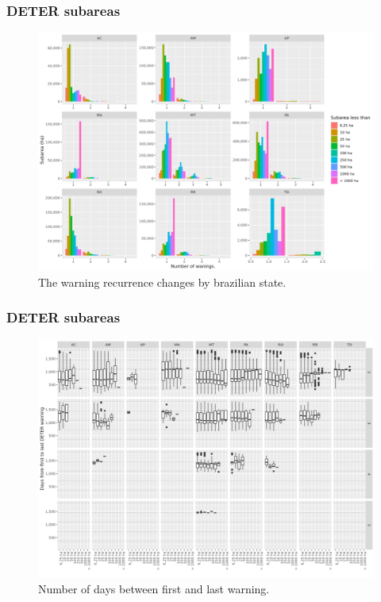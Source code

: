 \documentclass[aspectratio=169]{beamer}
\begin{document}
\begin{frame}
    \frametitle{DETER subareas}
    \begin{figure}[h] 
        \includegraphics[width=0.65\linewidth]
        {./figures/plot_deter_subarea_by_warnings_state.png}
        \caption{The warning recurrence changes by brazilian state.}
        \label{fig:deter_subarea_warnings_state}
    \end{figure}
\end{frame}

\begin{frame}
    \frametitle{DETER subareas}
    \begin{figure}[h] 
        \includegraphics[width=0.65\linewidth]
        {./figures/plot_deter_days_first_to_last.png}
        \caption{Number of days between first and last warning.}
        \label{fig:deter_days_first_to_last}
    \end{figure}
\end{frame}
\end{document}
